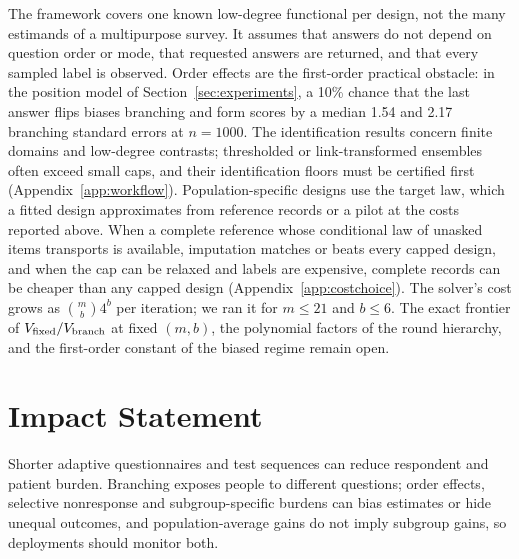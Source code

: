 \documentclass{article}
\begin{document}
The framework covers one known low-degree functional per design, not the many estimands of a multipurpose survey. It assumes that answers do not depend on question order or mode, that requested answers are returned, and that every sampled label is observed. Order effects are the first-order practical obstacle: in the position model of Section~\ref{sec:experiments}, a 10\% chance that the last answer flips biases branching and form scores by a median 1.54 and 2.17 branching standard errors at $n=1000$. The identification results concern finite domains and low-degree contrasts; thresholded or link-transformed ensembles often exceed small caps, and their identification floors must be certified first (Appendix~\ref{app:workflow}). Population-specific designs use the target law, which a fitted design approximates from reference records or a pilot at the costs reported above. When a complete reference whose conditional law of unasked items transports is available, imputation matches or beats every capped design, and when the cap can be relaxed and labels are expensive, complete records can be cheaper than any capped design (Appendix~\ref{app:costchoice}). The solver's cost grows as $\binom mb4^b$ per iteration; we ran it for $m\le21$ and $b\le6$. The exact frontier of $V_{\rm fixed}/V_{\rm branch}$ at fixed $(m,b)$, the polynomial factors of the round hierarchy, and the first-order constant of the biased regime remain open.

\section*{Impact Statement}
Shorter adaptive questionnaires and test sequences can reduce respondent and patient burden. Branching exposes people to different questions; order effects, selective nonresponse and subgroup-specific burdens can bias estimates or hide unequal outcomes, and population-average gains do not imply subgroup gains, so deployments should monitor both.



\clearpage
\onecolumn
\raggedbottom
\appendix
{}

\end{document}
